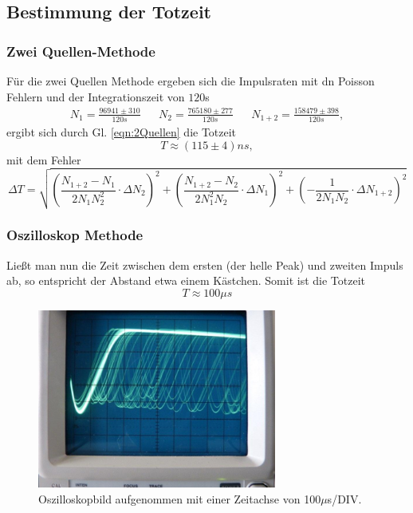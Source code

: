\subsection{Bestimmung der Totzeit}
\subsubsection*{Zwei Quellen-Methode}
Für die zwei Quellen Methode ergeben sich die Impulsraten mit dn Poisson Fehlern und
der Integrationszeit von $120$s
\begin{align*}
    N_1=\frac{96941\pm310}{120\si{s}} && N_2=\frac{765180\pm277}{120\si{s}} && N_{1+2}=\frac{158479\pm398}{120\si{s}},
\end{align*} 
ergibt sich durch Gl. \ref{eqn:2Quellen} die Totzeit
\begin{equation}
    T \approx (115\pm4)\si{ns},
\end{equation}
mit dem Fehler
\begin{equation*}
    \Delta T = \sqrt{\left(\frac{N_{1+2}-N_1}{2N_1N_2^2}\cdot \Delta N_2\right)^2+\left(\frac{N_{1+2}-N_2}{2N_1^2N_2}\cdot \Delta N_1\right)^2+\left(-\frac{1}{2N_1N_2}\cdot \Delta N_{1+2}\right)^2}
\end{equation*}
\subsubsection*{Oszilloskop Methode}
Ließt man nun die Zeit zwischen dem ersten (der helle Peak) und zweiten Impuls ab, so 
entspricht der Abstand etwa einem Kästchen. Somit ist die Totzeit
\begin{equation*}
    T\approx 100\mu s
\end{equation*}
\begin{figure}
    \centering
    \includegraphics[width=0.7\textwidth]{input/oszilloskop.jpg}
    \caption{Oszilloskopbild aufgenommen mit einer Zeitachse von 100$\mu$s/DIV.}
\end{figure}
